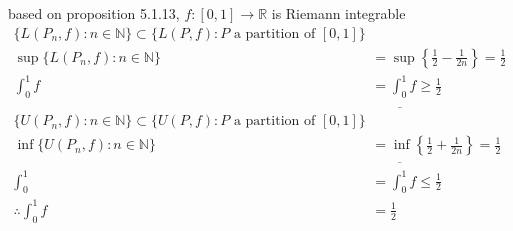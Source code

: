 \documentclass[12pt, border = 4pt, multi]{article} %
\begin{document}
based on proposition 5.1.13, $f: [0, 1] \rightarrow \mathbb{R}$ is Riemann integrable
\begin{align*}
\{L(P_n, f): n \in \mathbb{N}\} \subset \{L(P, f): P \text{ a partition of } [0, 1]\}\\
\sup\{L(P_n, f): n \in \mathbb{N}\} &= \sup\left\{\frac{1}{2} - \frac{1}{2n}\right\} = \frac{1}{2}\\
\int_0 ^ 1 f &= \underline{\int_0 ^ 1} f \geq \frac{1}{2}\\
\{U(P_n, f): n \in \mathbb{N}\} \subset \{U(P, f): P \text{ a partition of } [0, 1]\}\\
\inf\{U(P_n, f): n \in \mathbb{N}\} &= \inf\left\{\frac{1}{2} + \frac{1}{2n}\right\} = \frac{1}{2}\\
\int_0 ^ 1 &= \overline{\int_0 ^ 1} f \leq \frac{1}{2}\\
\therefore \int_0 ^ 1 f &= \frac{1}{2}\\
\end{align*}
\end{document}
